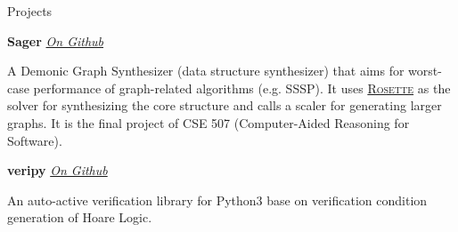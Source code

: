 \documentclass{resume}
\begin{document}
	\begin{rSection}{Projects}
	




		\textbf{Sager} \hfill {\em {\href{https://github.com/AD1024/Sager}{On Github}}}
		\vspace{-5pt}

		A Demonic Graph Synthesizer (data structure synthesizer) that aims for worst-case performance of graph-related algorithms (e.g. SSSP). It uses \href{https://github.com/emina/rosette}{\textsc{Rosette}} as the solver for synthesizing the core structure and calls a scaler for generating larger graphs. It is the final project of CSE 507 (Computer-Aided Reasoning for Software).

		\textbf{veripy} \hfill {\em {\href{https://github.com/AD1024/veripy}{On Github}}}
		\vspace{-5pt}

		An auto-active verification library for Python3 base on verification condition generation of Hoare Logic.


\end{rSection}
\end{document}
